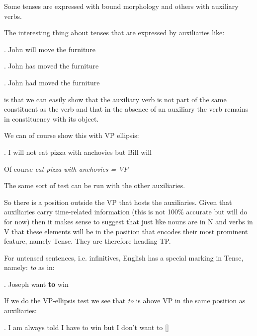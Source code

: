 {\begin{frame}
Some tenses are expressed with bound morphology and others with auxiliary verbs.

\end{frame}

\begin{frame}
  The interesting thing about tenses that are expressed by auxiliaries like:

\ex. John will move the furniture

\ex. John has moved the furniture

\ex. John had moved the furniture

is that we can easily show that the auxiliary verb is not part of the same constituent as the verb and that in the absence of an auxiliary the verb remains in constituency with its object.


\end{frame}

\begin{frame}
  We can of course show this with VP ellipsis:

\ex.
I will not eat pizza with anchovies but Bill will 

Of course \textit{eat pizza with anchovies = VP}

The same sort of test can be run with the other auxiliaries.


\end{frame}


\begin{frame}
  So there is a position outside the VP that hosts the auxiliaries.  Given that auxiliaries carry time-related information (this is not 100\% accurate but will do for now) then it makes sense to suggest that just like nouns are in N and verbs in V that these elements will be in the position that encodes their most prominent feature, namely Tense.  They are therefore heading TP.
\end{frame}

\begin{frame}
  For untensed sentences, i.e. infinitives, English has a special marking in Tense, namely: \textit{to} as in:

\ex.
Joseph want \textbf{to} win

If we do the VP-ellipsis test we see that \textit{to} is above VP in the same position as auxiliaries:

\ex.
I am always told I have to win but I don't want to [\str{win]}]



\end{frame}}
